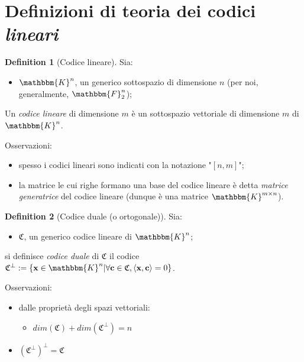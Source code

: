 \documentclass[12pt, a4paper]{report}
\theoremstyle{definition}
\newtheorem{definition}{Definition}[section]
\begin{document}
		\section{Definizioni di teoria dei codici \emph{lineari} \cite{4} \cite{5} \cite{6}}
			\begin{definition}[Codice lineare]
				Sia:
					\begin{itemize}
						\item $\mathbbm{K}^n$, un generico sottospazio di dimensione $n$ (per noi, generalmente, $\mathbbm{F}^n_2$);
					\end{itemize}
				\begin{center}
					Un \emph{codice lineare} di dimensione $m$ è un sottospazio vettoriale di dimensione $m$ di $\mathbbm{K}^n$.
				\end{center}
				Osservazioni:
				\begin{itemize}
					\item spesso i codici lineari sono indicati con la notazione "$[n,m]$";
					\item la matrice le cui righe formano una base del codice lineare è detta \emph{matrice generatrice} del codice lineare (dunque è una matrice $\mathbbm{K}^{m\times n}$).
				\end{itemize}
			\end{definition}
			\begin{definition}[Codice duale (o ortogonale)]
				Sia:
					\begin{itemize}
						\item $\mathfrak{C}$, un generico codice lineare di $\mathbbm{K}^n$;
					\end{itemize}
				\begin{center}
					si definisce \emph{codice duale} di $\mathfrak{C}$ il codice $\mathfrak{C}^\perp := \{\textbf{x}\in\mathbbm{K}^n|\forall \textbf{c}\in\mathfrak{C},\langle \textbf{x},\textbf{c} \rangle=0\}$.
				\end{center}
				Osservazioni:
					\begin{itemize}
						\item dalle proprietà degli spazi vettoriali:
						\begin{itemize}
							\item $dim(\mathfrak{C})+dim(\mathfrak{C}^\perp)=n$
						\end{itemize}
						\item $(\mathfrak{C}^\perp)^\perp=\mathfrak{C}$
					\end{itemize}
			\end{definition}
\end{document}
